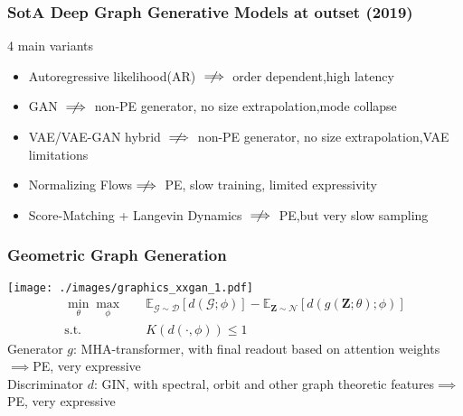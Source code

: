 \documentclass[./presentation.tex]{subfiles}
\begin{document}
\begin{frame}[label=working]
  \frametitle{SotA Deep Graph Generative Models at outset (2019)}
  \small
  4 main variants
  \begin{itemize}
    \item Autoregressive likelihood(AR) $\centernot\implies$ order dependent,high latency
    \item GAN %
      $\centernot\implies$ non-PE generator, no size extrapolation,mode collapse
    \item VAE/VAE-GAN hybrid%
      $\centernot\implies$ non-PE generator, no size extrapolation,VAE limitations %
    \item Normalizing Flows$\centernot\implies$ PE, slow training, limited expressivity
    \item Score-Matching + Langevin Dynamics  $\centernot\implies$ PE,but very slow sampling
  \end{itemize}
\end{frame}

\begin{frame}[label=working,t]
  \frametitle{Geometric Graph Generation}
  \texttt{[image: ./images/graphics\_xxgan\_1.pdf]}
  \vspace{-0.5cm}
  \begin{align}
    \min_{\theta}\max_{\phi}&\quad\mathbb{E}_{\mathcal{G}\sim \mathcal{D}}\left[d\left(\mathcal{G};\phi\right)\right]-\mathbb{E}_{\mathbf{Z}\sim \mathcal{N}}\left[d\left(g(\mathbf{Z};\theta);\phi\right)\right]\nonumber\\
    \text{s.t.}&\quad K\left(d\left(\cdot,\phi\right)\right)\leq 1\nonumber
  \end{align}
  \vspace{-0.25cm}
  Generator $g$: MHA-transformer, with final readout based on attention weights$\implies$PE, very expressive\\
  Discriminator $d$: GIN, with spectral, orbit and other graph theoretic features$\implies$PE, very expressive
\end{frame}
\end{document}
